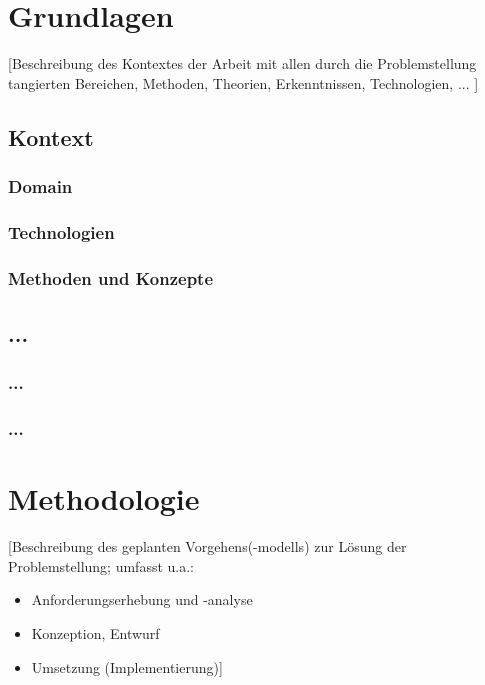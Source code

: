 \documentclass[oneside,bibliography=totocnumbered,BCOR=5mm]{scrbook}%
\theoremstyle{definition}
\theoremstyle{definition}
\theoremstyle{definition}
\theoremstyle{definition}
\theoremstyle{definition}
\theoremstyle{definition}
\begin{document}
\chapter{Grundlagen}
[Beschreibung des Kontextes der Arbeit mit allen durch die Problemstellung tangierten Bereichen, Methoden, Theorien, Erkenntnissen, Technologien, ... ] 


\section{Kontext}


\subsection{Domain} 



\subsection{Technologien}


\subsection{Methoden und Konzepte}


\section{...}


\subsection{...}


\subsection{...}

\chapter{Methodologie}

[Beschreibung des geplanten Vorgehens(-modells) zur L\"osung der Problemstellung; umfasst u.a.:
\begin{itemize}
\item Anforderungserhebung und -analyse
\item Konzeption, Entwurf
\item Umsetzung (Implementierung)]
\end{itemize}
\end{document}
